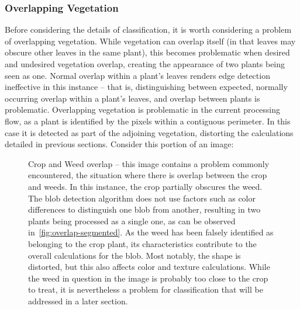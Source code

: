 \documentclass[letterpaper]{report}
\begin{document}
\subsubsection{Overlapping Vegetation}
\label{problem-overlap}

Before considering the details of classification, it is worth considering a problem of overlapping vegetation. While vegetation can overlap itself (in that leaves may obscure other leaves in the same plant), this becomes problematic when desired and undesired vegetation overlap, creating the appearance of two plants being seen as one. Normal overlap within a plant's leaves renders edge detection ineffective in this instance -- that is, distinguishing between expected, normally occurring overlap within a plant's leaves, and overlap between plants is problematic. Overlapping vegetation is problematic in the current processing flow, as a plant is identified by the pixels within a contiguous  perimeter. In this case it is detected as part of the adjoining vegetation, distorting the calculations detailed in previous sections.  Consider this portion of an image:

\begin{figure}[h]
	\centering
	\hfill
	\caption[Crop and Weed overlap]{Crop and Weed overlap -- this image contains a problem commonly encountered, the situation where there is overlap between the crop and weeds. In this instance, the crop partially obscures the weed. The blob detection algorithm does not use factors such as color differences to distinguish one blob from another, resulting in two plants being processed as a single one, as can be observed in~\ref{fig:overlap-segmented}. As the weed has been falsely identified as belonging to the crop plant, its characteristics contribute to the overall calculations for the blob. Most notably, the shape is distorted, but this also affects color and texture calculations. While the weed in question in the image is probably too close to the crop to treat, it is nevertheless a problem for classification that will be addressed in a later section.}
	\label{fig:overlap}
\end{figure}
\end{document}
